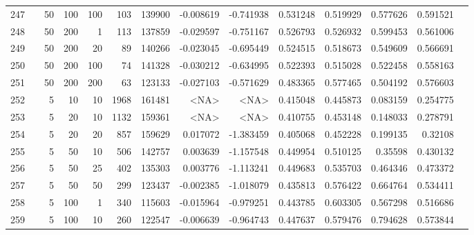 \begin{longtable}{llrrrrrrrrrrrr}
		247 & &           50 &               100 &          100 &         103 &     139900 & -0.008619 & -0.741938 &  0.531248 &    0.519929 &       0.577626 &  0.591521 \\
		248 & &           50 &               200 &            1 &         113 &     137859 & -0.029597 & -0.751167 &  0.526793 &    0.526932 &       0.599453 &  0.561006 \\
		249 & &           50 &               200 &           20 &          89 &     140266 & -0.023045 & -0.695449 &  0.524515 &    0.518673 &       0.549609 &  0.566691 \\
		250 & &           50 &               200 &          100 &          74 &     141328 & -0.030212 & -0.634995 &  0.522393 &    0.515028 &       0.522458 &  0.558163 \\
		251 & &           50 &               200 &          200 &          63 &     123133 & -0.027103 & -0.571629 &  0.483365 &    0.577465 &       0.504192 &  0.576603 \\\midrule
		252 &  \multirow[t]{84}{*}{\rotatebox[origin=r]{90}{sbert-tf-idf-weighted}} &            5 &                10 &           10 &        1968 &     161481 &      <NA> &      <NA> &  0.415048 &    0.445873 &       0.083159 &  0.254775 \\
		253 & &            5 &                20 &           10 &           1132 &     159361 &      <NA> &      <NA> &  0.410755 &    0.453148 &       0.148033 &  0.278791 \\
		254 & &            5 &                20 &           20 &         857 &     159629 &  0.017072 & -1.383459 &  0.405068 &    0.452228 &       0.199135 &   0.32108 \\
		255 & &            5 &                50 &           10 &         506 &     142757 &  0.003639 & -1.157548 &  0.449954 &    0.510125 &        0.35598 &  0.430132 \\
		256 & &            5 &                50 &           25 &         402 &     135303 &  0.003776 & -1.113241 &  0.449683 &    0.535703 &       0.464346 &  0.473372 \\
		257 & &            5 &                50 &           50 &         299 &     123437 & -0.002385 & -1.018079 &  0.435813 &    0.576422 &       0.664764 &  0.534411 \\
		258 & &            5 &               100 &            1 &         340 &     115603 & -0.015964 & -0.979251 &  0.443785 &    0.603305 &       0.567298 &  0.516686 \\
		259 & &            5 &               100 &           10 &         260 &     122547 & -0.006639 & -0.964743 &  0.447637 &    0.579476 &       0.794628 &  0.573844 \\

\end{longtable}
